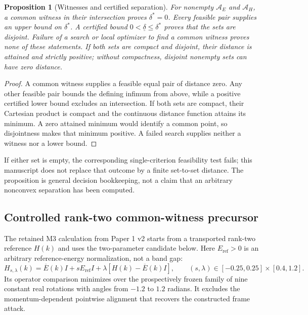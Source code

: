 \documentclass[11pt]{article}
\newtheorem{proposition}{Proposition}
\begin{document}
\begin{proposition}[Witnesses and certified separation]
\label{prop:witness-separation}
For nonempty $\mathcal A_E$ and $\mathcal A_H$, a common witness in their intersection
proves $\delta^*=0$. Every feasible pair supplies an upper bound on $\delta^*$. A
certified bound $0<\underline\delta\le\delta^*$ proves that the sets are disjoint.
Failure of a search or local optimizer to find a common witness proves none of these
statements. If both sets are compact and disjoint, their distance is attained and
strictly positive; without compactness, disjoint nonempty sets can have zero distance.
\end{proposition}

\begin{proof}
A common witness supplies a feasible equal pair of distance zero. Any other feasible
pair bounds the defining infimum from above, while a positive certified lower bound
excludes an intersection. If both sets are compact, their Cartesian product is compact
and the continuous distance function attains its minimum. A zero attained minimum would
identify a common point, so disjointness makes that minimum positive. A failed search
supplies neither a witness nor a lower bound.
\end{proof}

If either set is empty, the corresponding single-criterion feasibility test fails; this
manuscript does not replace that outcome by a finite set-to-set distance. The proposition
is general decision bookkeeping, not a claim that an arbitrary nonconvex separation has
been computed.

\subsection{Controlled rank-two common-witness precursor}
The retained M3 calculation from Paper 1 v2 starts from a transported rank-two reference
$H(k)$ and uses the two-parameter candidate below. Here $E_{\mathrm{ref}}>0$ is an
arbitrary reference-energy normalization, not a band gap:
\begin{equation}
 H_{s,\lambda}(k)=\overline E(k)I+sE_{\mathrm{ref}}I
 +\lambda\left[H(k)-\overline E(k)I\right],
 \qquad (s,\lambda)\in[-0.25,0.25]\times[0.4,1.2].
\end{equation}
Its operator comparison minimizes over the prospectively frozen family of nine constant
real rotations with angles from $-1.2$ to $1.2$ radians. It excludes the
momentum-dependent pointwise alignment that recovers the constructed frame attack.
\end{document}
